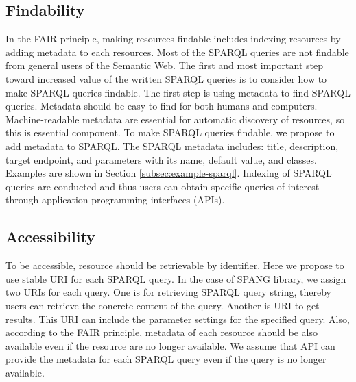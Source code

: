 \documentclass[runningheads]{llncs}
\begin{document}
\subsection{Findability}
In the FAIR principle, making resources findable includes indexing resources by adding metadata to each resources. 
Most of the SPARQL queries are not findable from general users of the Semantic Web. 
The first and most important step toward increased value of the written SPARQL queries is to consider how to make SPARQL queries findable.
The first step is using metadata to find SPARQL queries. 
Metadata should be easy to find for both humans and computers. Machine-readable metadata are essential for automatic discovery of resources, so this is essential component.
To make SPARQL queries findable, we propose to add metadata to SPARQL.
The SPARQL metadata includes: title, description, target endpoint, and parameters with its name, default value, and classes.
Examples are shown in Section \ref{subsec:example-sparql}.
Indexing of SPARQL queries are conducted and thus users can obtain specific queries of interest through application programming interfaces (APIs).

\subsection{Accessibility}
To be accessible, resource should be retrievable by identifier.
Here we propose to use stable URI for each SPARQL query.
In the case of SPANG library, we assign two URIs for each query. 
One is for retrieving SPARQL query string, thereby users can retrieve the concrete content of the query. 
Another is URI to get results. This URI can include the parameter settings for the specified query.
Also, according to the FAIR principle, metadata of each resource should be also available even if the resource are no longer available. 
We assume that API can provide the metadata for each SPARQL query even if the query is no longer available.
\end{document}
